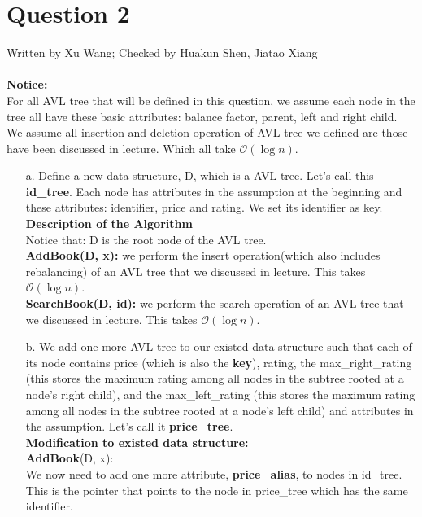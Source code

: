 \documentclass[10pt]{article}
\begin{document}
\section*{Question 2} Written by Xu Wang; Checked by Huakun Shen, Jiatao Xiang\\
\\
\textbf{Notice:}\\
For all AVL tree that will be defined in this question, we assume each node in the tree all have these basic attributes: balance factor, parent, left and right child. We assume all insertion and deletion operation of AVL tree we defined are those have been discussed in lecture. Which all take $\mathcal{O}(\log{}n)$.\\
\begin{enumerate}
\item[a.]
Define a new data structure, D, which is a AVL tree. Let's call this \textbf{id\_tree}. Each node has attributes in the assumption at the beginning and these attributes: identifier, price and rating. We set its identifier as key.\\
\textbf{Description of the Algorithm}\\
Notice that: D is the root node of the AVL tree.\\
\textbf{AddBook(D, x):} we perform the insert operation(which also includes rebalancing) of an AVL tree that we discussed in lecture. This takes $\mathcal{O}(\log{}n)$.\\
\textbf{SearchBook(D, id):} we perform the search operation of an AVL tree that we discussed in lecture. This takes $\mathcal{O}(\log{}n)$.\\
\item[b.]
We add one more AVL tree to our existed data structure such that each of its node contains price (which is also the \textbf{key}), rating, the max\_right\_rating (this stores the maximum rating among all nodes in the subtree rooted at a node's right child), and the max\_left\_rating (this stores the maximum rating among all nodes in the subtree rooted at a node's left child) and attributes in the assumption. Let's call it \textbf{price\_tree}.\\
\textbf{Modification to existed data structure:}\\
\textbf{AddBook}(D, x):\\
We now need to add one more attribute, \textbf{price\_alias}, to nodes in id\_tree. This is the pointer that points to the node in price\_tree which has the same identifier.\\

\end{enumerate}
\end{document}
